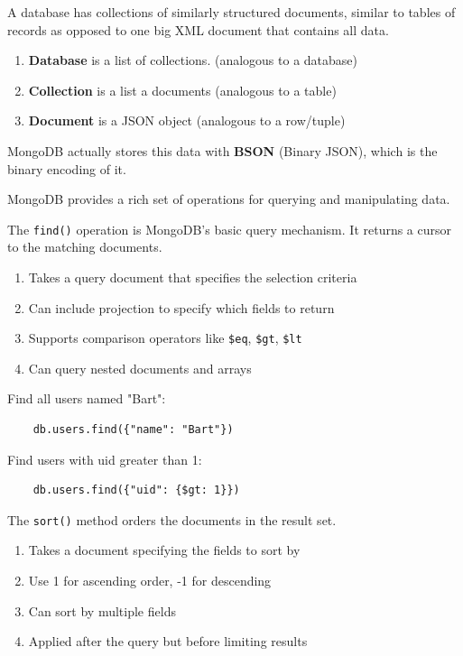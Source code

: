 \begin{definition}
  \label{def:mongodb-database}
  A database has collections of similarly structured documents, similar to tables of records as opposed to one big XML document that contains all data.  
  \begin{enumerate}
    \item \textbf{Database} is a list of collections. (analogous to a database)
    \item \textbf{Collection} is a list a documents (analogous to a table)
    \item \textbf{Document} is a JSON object (analogous to a row/tuple)
  \end{enumerate}
  MongoDB actually stores this data with \textbf{BSON} (Binary JSON), which is the binary encoding of it. 
\end{definition}  

MongoDB provides a rich set of operations for querying and manipulating data. 

\begin{definition}[find()]
  \label{def:find}
  The \texttt{find()} operation is MongoDB's basic query mechanism. It returns a cursor to the matching documents.
  \begin{enumerate}
    \item Takes a query document that specifies the selection criteria
    \item Can include projection to specify which fields to return
    \item Supports comparison operators like \texttt{\$eq}, \texttt{\$gt}, \texttt{\$lt}
    \item Can query nested documents and arrays
  \end{enumerate}
\end{definition}

\begin{example}
  \label{ex:basic-query}
  Find all users named "Bart":
  \begin{lstlisting}
    db.users.find({"name": "Bart"})
  \end{lstlisting}
  Find users with uid greater than 1:
  \begin{lstlisting}
    db.users.find({"uid": {$gt: 1}})
  \end{lstlisting}
\end{example}

\begin{definition}[sort()]
  \label{def:sort}
  The \texttt{sort()} method orders the documents in the result set.
  \begin{enumerate}
    \item Takes a document specifying the fields to sort by
    \item Use 1 for ascending order, -1 for descending
    \item Can sort by multiple fields
    \item Applied after the query but before limiting results
  \end{enumerate}
\end{definition}


